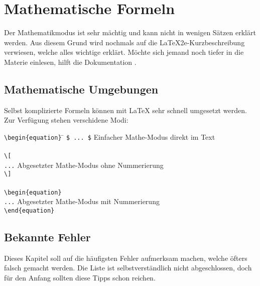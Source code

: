 \section{Mathematische Formeln}
Der Mathematikmodus ist sehr mächtig und kann nicht in wenigen Sätzen erklärt werden. Aus diesem Grund wird nochmals auf die \LaTeX2e-Kurzbeschreibung verwiesen, welche alles wichtige erklärt.
Möchte sich jemand noch tiefer in die Materie einlesen, hilft die Dokumentation \cite{doc_mathmode}.

\subsection{Mathematische Umgebungen}
Selbst komplizierte Formeln können mit \LaTeX{} sehr schnell umgesetzt werden. Zur Verfügung stehen verschidene Modi:
\begin{tabbing}
\quad \= \verb|\begin{equation}| \qquad \= \kill
      \> \verb|$ ... $|          \> Einfacher Mathe-Modus direkt im Text\\
      \\
      \> \verb|\[|         \> \\
      \> \verb|...|         \> Abgesetzter Mathe-Modus ohne Nummerierung \\
      \> \verb|\]|         \> \\
      \\
      \> \verb|\begin{equation}|  \> \\
      \> \verb|...|  \> Abgesetzter Mathe-Modus mit Nummerierung\\
      \> \verb|\end{equation}|
\end{tabbing}

\subsection{Bekannte Fehler}
Dieses Kapitel soll auf die häufigsten Fehler aufmerksam machen, welche öfters falsch gemacht werden. Die Liste ist selbstverständlich nicht abgeschlossen, doch für den Anfang sollten diese Tipps schon reichen.

